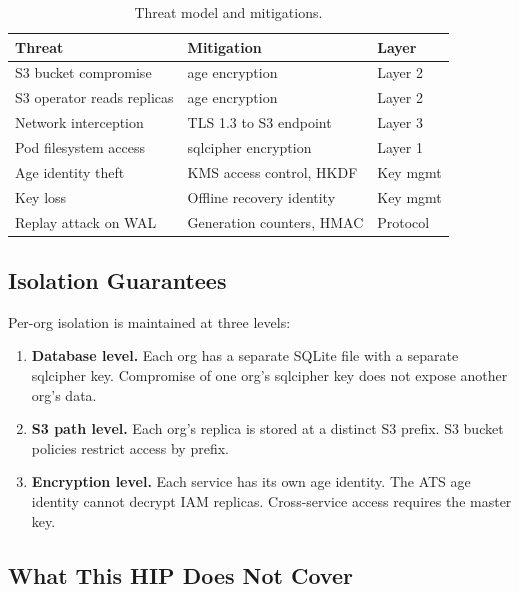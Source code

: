 \documentclass[11pt]{article}
\begin{document}
\begin{table}[H]
\centering
\begin{tabular}{@{}lll@{}}
\toprule
\textbf{Threat} & \textbf{Mitigation} & \textbf{Layer} \\
\midrule
S3 bucket compromise         & age encryption             & Layer 2 \\
S3 operator reads replicas   & age encryption             & Layer 2 \\
Network interception          & TLS 1.3 to S3 endpoint    & Layer 3 \\
Pod filesystem access         & sqlcipher encryption       & Layer 1 \\
Age identity theft            & KMS access control, HKDF  & Key mgmt \\
Key loss                      & Offline recovery identity  & Key mgmt \\
Replay attack on WAL          & Generation counters, HMAC  & Protocol \\
\bottomrule
\end{tabular}
\caption{Threat model and mitigations.}
\label{tab:threats}
\end{table}

\subsection{Isolation Guarantees}

Per-org isolation is maintained at three levels:

\begin{enumerate}[nosep]
    \item \textbf{Database level.} Each org has a separate SQLite file with a
    separate sqlcipher key. Compromise of one org's sqlcipher key does not
    expose another org's data.

    \item \textbf{S3 path level.} Each org's replica is stored at a distinct
    S3 prefix. S3 bucket policies restrict access by prefix.

    \item \textbf{Encryption level.} Each service has its own age identity.
    The ATS age identity cannot decrypt IAM replicas. Cross-service access
    requires the master key.
\end{enumerate}

\subsection{What This HIP Does Not Cover}
\end{document}
